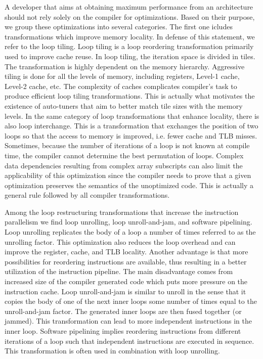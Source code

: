 A developer that aims at obtaining maximum performance from an architecture
should not rely solely on the compiler for optimizations. Based on their
purpose, we group these optimizations into several categories. The first one
icludes transformations which improve memory locality. In defense of this
statement, we refer to the loop tiling. Loop tiling is a loop reordering
transformation primarily used to improve cache reuse. In loop tiling, the
iteration space is divided in tiles. The transformation is highly dependent on
the memory hierarchy. Aggressive tiling is done for all the levels of memory,
including registers, Level-1 cache, Level-2 cache, etc. The complexity of caches
complicates compiler's task to produce efficient loop tiling transformations.
This is actually what motivates the existence of auto-tuners that aim to better
match tile sizes with the memory levels. In the same category of loop
transformations that enhance locality, there is also loop interchange. This is a
transformation that exchanges the position of two loops so that the access to
memory is improved, i.e. fewer cache and TLB misses. Sometimes, because the
number of iterations of a loop is not known at compile time, the compiler cannot
determine the best permutation of loops. Complex data dependencies resulting
from complex array subscripts can also limit the applicability of this
optimization since the compiler needs to prove that a given optimization
preserves the semantics of the unoptimized code. This is actually a general rule
followed by all compiler transformations.

Among the loop restructuring transformations that increase the instruction
parallelism we find loop unrolling, loop unroll-and-jam, and software
pipelining. Loop unrolling replicates the body of a loop a number of times
referred to as the unrolling factor. This optimization also reduces the loop
overhead and can improve the register, cache, and TLB locality. Another
advantage is that more possibilities for reordering instructions are available,
thus resulting in a better utilization of the instruction pipeline. The main
disadvantage comes from increased size of the compiler generated code which puts
more pressure on the instruction cache. Loop unroll-and-jam is similar to unroll
in the sense that it copies the body of one of the next inner loops some number
of times equal to the unroll-and-jam factor. The generated inner loops are then
fused together (or jammed). This transformation can lead to more independent
instructions in the inner loop. Software pipelining implies reordering
instructions from different iterations of a loop such that independent
instructions are executed in sequence. This transformation is often used in
combination with loop unrolling.


